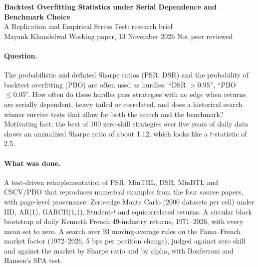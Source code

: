 \documentclass[10pt,a4paper]{article}
\begin{document}
\begin{center}
{\large\textbf{Backtest Overfitting Statistics under Serial Dependence and Benchmark Choice}}\\[2pt]
{A Replication and Empirical Stress Test: research brief}\\[2pt]
{\small Mayank Khandelwal \quad Working paper, 13 November 2026 \quad Not peer reviewed}
\end{center}

\paragraph{Question.} The probabilistic and deflated Sharpe ratios (PSR, DSR) and the probability of backtest overfitting (PBO) are often used as hurdles: ``DSR $>0.95$'', ``PBO $\le0.05$''. How often do these hurdles pass strategies with no edge when returns are serially dependent, heavy tailed or correlated, and does a historical search winner survive tests that allow for both the search and the benchmark? Motivating fact: the best of 100 zero-skill strategies over five years of daily data shows an annualized Sharpe ratio of about 1.12, which looks like a $t$-statistic of 2.5.

\paragraph{What was done.} A test-driven reimplementation of PSR, MinTRL, DSR, MinBTL and CSCV/PBO that reproduces numerical examples from the four source papers, with page-level provenance. Zero-edge Monte Carlo (2000 datasets per cell) under IID, AR(1), GARCH(1,1), Student-$t$ and equicorrelated returns. A circular block bootstrap of daily Kenneth French 49-industry returns, 1971--2026, with every mean set to zero. A search over 93 moving-average rules on the Fama--French market factor (1972--2026, 5 bps per position change), judged against zero skill and against the market by Sharpe ratio and by alpha, with Bonferroni and Hansen's SPA test.
\end{document}
